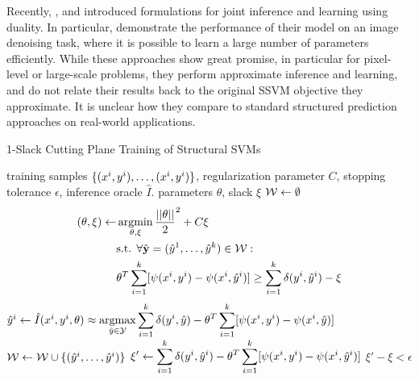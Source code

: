 Recently, \citet{meshi2010learning}, \citet{hazan2010primal} and
\citet{komodakis2011efficient} introduced formulations for joint inference and
learning using duality.
In particular, \citet{hazan2010primal} demonstrate the performance of their
model on an image denoising task, where it is possible to learn a large number
of parameters efficiently.
While these approaches show great promise, in particular for pixel-level or
large-scale problems, they perform approximate inference and learning, and do
not relate their results back to the original SSVM objective they approximate.
It is unclear how they compare to standard structured prediction approaches
on real-world applications.

\begin{algorithm*}[t]
    \caption{1-Slack Cutting Plane Training of Structural SVMs \label{alg_one_slack_again}}
    \begin{algorithmic}[1]
        \Require training samples $\{ (x^{i}, y^{i}), \dots, (x^{i}, y^{i})\}$, regularization parameter $C$, stopping tolerance $\epsilon$, inference oracle $\hat{I}$.
        \Ensure parameters $\theta$, slack $\xi$
        \State $\mathcal{W} \leftarrow \emptyset$
        \Repeat
            \State \label{line_restricted}
            \vspace{-5mm}
            \begin{align*}
                (\theta, \xi) \leftarrow \displaystyle &\operatorname*{argmin}_{\theta, \xi} \frac{||\theta||}{2}^2 + C \xi\\
            &\text{s.t. }\forall \hat{\mathbf{y}}=(\hat{y}^{1}, \dots, \hat{y}^{k}) \in \mathcal{W}:\\
            &\theta^T \sum_{i=1}^k [\psi(x^{i}, y^{i}) - \psi(x^{i}, \hat{y}^{i})] \geq \sum_{i=1}^k \delta(y^{i}, \hat{y}^{i}) - \xi
            \end{align*}
                \State
                $\hat{y}^{i} \leftarrow \hat{I}(x^{i}, y^{i}, \theta) \approx \displaystyle \operatorname*{argmax}_{\hat{y}\in\mathcal{Y}} \sum_{i=1}^k \delta(y^{i}, \hat{y}) - \theta^T \sum_{i=1}^k [\psi(x^{i}, y^{i}) - \psi(x^{i}, \hat{y})]$ \label{get_cutting_plane_again}
            \EndFor
            \State $\mathcal{W} \leftarrow \mathcal{W} \cup \{ (\hat{y}^{i}, \dots, \hat{y}^{i}) \} $
            \State $ \displaystyle \xi' \leftarrow  \sum_{i=1}^k \delta(y^{i}, \hat{y}^{i}) - \theta^T \sum_{i=1}^k [\psi(x^{i}, y^{i}) - \psi(x^{i}, \hat{y}^{i})] $
        \Until $\xi' - \xi < \epsilon$ \label{convergence_check}
    \end{algorithmic}
\end{algorithm*}

